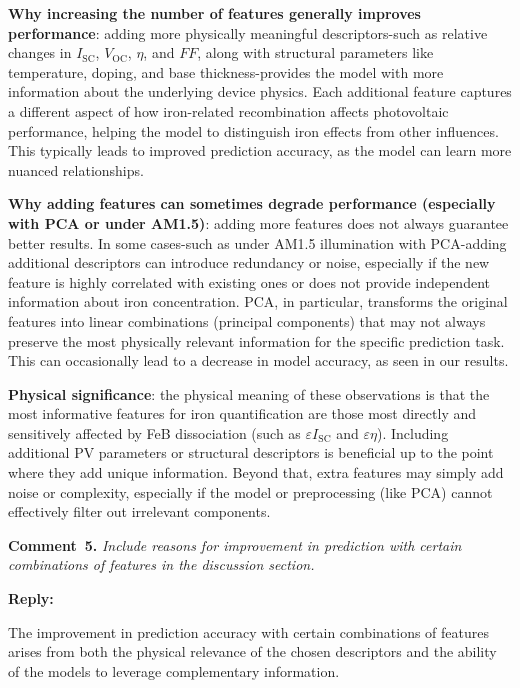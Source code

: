 \documentclass[a4paper,fleqn]{cas-sc}
\begin{document}
\textbf{Why increasing the number of features generally improves performance}:
adding more physically meaningful descriptors-such as relative changes in $I_\mathrm{SC}$, $V_\mathrm{OC}$, $\eta$, and $FF$, along with structural parameters like temperature, doping, and base thickness-provides the model with more information about the underlying device physics. 
Each additional feature captures a different aspect of how iron-related recombination affects photovoltaic performance, helping the model to distinguish iron effects from other influences. 
This typically leads to improved prediction accuracy, as the model can learn more nuanced relationships.


\textbf{Why adding features can sometimes degrade performance (especially with PCA or under AM1.5)}:
adding more features does not always guarantee better results. 
In some cases-such as under AM1.5 illumination with PCA-adding additional descriptors can introduce redundancy or noise, especially if the new feature is highly correlated with existing ones or does not provide independent information about iron concentration. 
PCA, in particular, transforms the original features into linear combinations (principal components) that may not always preserve the most physically relevant information for the specific prediction task. 
This can occasionally lead to a decrease in model accuracy, as seen in our results.


\textbf{Physical significance}: the physical meaning of these observations is that the most informative features for iron quantification are those most directly and sensitively affected by FeB dissociation (such as $\varepsilon I_\mathrm{SC}$ and $\varepsilon \eta$). 
Including additional PV parameters or structural descriptors is beneficial up to the point where they add unique information. 
Beyond that, extra features may simply add noise or complexity, especially if the model or preprocessing (like PCA) cannot effectively filter out irrelevant components.


\vspace{1cm}
\noindent
\textcolor[rgb]{0.00,0.50,1.00}{\textbf{Comment~5.}}
\emph{Include reasons for improvement in prediction with certain combinations of features in the discussion section.}

\noindent
\textcolor[rgb]{0.51,0.00,0.00}{\textbf{Reply:}}

The improvement in prediction accuracy with certain combinations of features arises from both the physical relevance of the chosen descriptors and the ability of the models to leverage complementary information.
\end{document}
